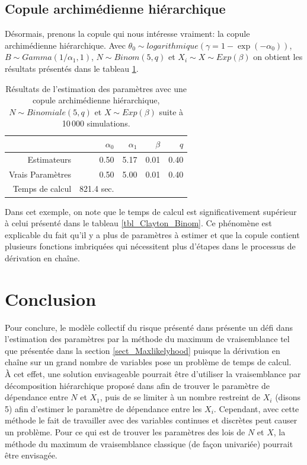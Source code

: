 \documentclass{article}
\begin{document}
	\subsection{Copule archimédienne hiérarchique}
	Désormais, prenons la copule qui nous intéresse vraiment: la copule archimédienne hiérarchique. Avec $\theta_0 \sim logarithmique\left(\gamma = 1-\exp(-\alpha_0)\right)$, $B \sim Gamma(1/\alpha_1, 1)$, $N \sim Binom(5,q)$ et $X_i \sim X \sim Exp(\beta)$ on obtient les résultats présentés dans le tableau \ref{tbl_archi_hierar}.
	\begin{table}[H]
		\centering
		\begin{tabular}{rrrrr}
			\hline
			& $\alpha_{0}$ & $\alpha_{1}$ & $\beta$ & $q$ \\ 
			\hline
			Estimateurs & 0.50 & 5.17 & 0.01 & 0.40 \\ 
			Vrais Paramètres & 0.50 & 5.00 & 0.01 & 0.40 \\ 
			\hline
			Temps de calcul & 821.4 sec. \\
			\hline
		\end{tabular}
		\renewcommand{\tablename}{Tableau}
		\caption[Estimations avec une copule archimédienne hiérarchique et $N\sim Binomiale$]{Résultats de l'estimation des paramètres avec une copule archimédienne hiérarchique, $N \sim Binomiale(5, q)$ et $X \sim Exp(\beta)$ suite à 10\,000 simulations.} \label{tbl_archi_hierar}
	\end{table}

	Dans cet exemple, on note que le temps de calcul est significativement supérieur à celui présenté dans le tableau \ref{tbl_Clayton_Binom}. Ce phénomène est explicable du fait qu'il y a plus de paramètres à estimer et que la copule contient plusieurs fonctions imbriquées qui nécessitent plus d'étapes dans le processus de dérivation en chaîne.
	
	\section{Conclusion}
	Pour conclure, le modèle collectif du risque présenté dans \cite{Itre5} présente un défi dans l'estimation des paramètres par la méthode du maximum de vraisemblance tel que présentée dans la section \ref{sect_Maxlikelyhood} puisque la dérivation en chaîne sur un grand nombre de variables pose un problème de temps de calcul.\\
	
	 À cet effet, une solution envisageable pourrait être d'utiliser la vraisemblance par décomposition hiérarchique proposé dans \cite{LikelyhoodEstimation} afin de trouver le paramètre de dépendance entre $N$ et $X_1$, puis de se limiter à un nombre restreint de $X_i$ (disons 5) afin d'estimer le paramètre de dépendance entre les $X_i$. Cependant, avec cette méthode le fait de travailler avec des variables continues et discrètes peut causer un problème. Pour ce qui est de trouver les paramètres des lois de $N$ et $X$, la méthode du maximum de vraisemblance classique (de façon univariée) pourrait être envisagée.
 
	
	\clearpage
	
	
	\clearpage
	
	\renewcommand*{\thepage}{A\arabic{page}}
	\appendix
\end{document}
